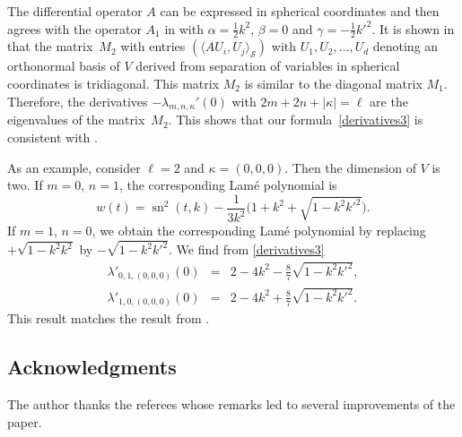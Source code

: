 \documentclass[10pt,a4paper]{amsart}
\newcommand{\Sp}{\mathcal{S}}
\DeclareMathOperator{\sn}{sn}
\numberwithin{equation}{section}
\begin{document}
The differential operator $A$ can be expressed in spherical coordinates and then agrees with
the operator $A_1$ in \cite{EK} with $\alpha=\frac12k^2$, $\beta=0$ and $\gamma=-\frac12k'^2$.
It is shown in \cite{EK} that the matrix~$M_2$ with entries $(\langle AU_i,U_j\rangle_\Sp)$ with $U_1,U_2,\dots,U_d$
denoting an orthonormal basis of $V$
derived from separation of variables in spherical coordinates is tridiagonal. This matrix $M_2$ is similar to
the diagonal matrix $M_1$. Therefore, the derivatives $-\lambda_{m,n,\kappa}'(0)$ with $2m+2n+|\kappa|=\ell$
are the eigenvalues of the matrix~$M_2$.
This shows that our formula~\eqref{derivatives3} is consistent with
\mbox{\cite[Theorem~4]{EK}}.

As an example, consider $\ell=2$ and $\kappa=(0,0,0)$.
Then the dimension of $V$ is two.
If $m=0$, $n=1$, the corresponding Lam\'e polynomial is \cite[p.~205]{A}
\[ w(t)=\sn^2(t,k)-\frac{1}{3k^2}\bigl(1+k^2+\sqrt{1-k^2k'^2}\bigr). \]
If $m=1$, $n=0$, we obtain the corresponding Lam\'e polynomial by replacing $+\sqrt{1-k^2k^2}$ by $-\sqrt{1-k^2k'^2}$.
We find from \eqref{derivatives3}
\begin{eqnarray*}
\lambda'_{0,1,(0,0,0)}(0)&=&2-4k^2-\tfrac87\sqrt{1-k^2k'^2},\\
\lambda'_{1,0,(0,0,0)}(0)&=&2-4k^2+\tfrac87\sqrt{1-k^2k'^2}.
\end{eqnarray*}
This result matches the result from \cite{EK}.

\subsection*{Acknowledgments}

The author thanks the referees whose remarks led to several improvements of the paper.
\end{document}
